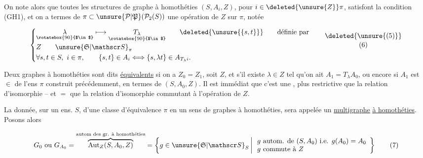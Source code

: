 On note alors que toutes les structures de graphe à homothéties $(S,A_i,Z)$, pour $i\in\deleted{\unsure{Z}}\pi$, satisfont la condition (GH1), et on a  termes de  $\pi\subset\unsure{\mathcal P|\mathfrak P}(\mathcal P_2(S))$ une opération de $Z$ sur $\pi$, notée

\[
\left\{\begin{aligned}
 &\underset{\rotatebox{90}{$\in$}}{\lambda}\longmapsto\underset{\rotatebox{90}{$\in$}}{T_\lambda}
       \qquad \deleted{\unsure{\{s,t\}}}\qquad\text{définie par}\\[-2pt]
 &Z\qquad \unsure{\mathfrak S|\mathscr S}_\pi\\
 &\forall s,t\in S,\ i\in\pi,\qquad\{s,t\}\in A_i\Longleftrightarrow\{s,\lambda t\}\in A_{T_\lambda i}.
\end{aligned}\right.\tag*{\shortstack{\deleted{\unsure{(5)}}\\(6)}}
\]


Deux  graphes à homothéties  sont dits \uline{équivalents}    si on a $Z_0=Z_1$, soit $Z$, et s'il existe $\lambda\in Z$ tel qu'on ait $A_1=T_\lambda A_0$,  ou encore si $A_1$ est $\in$ de l'ens $\pi$ construit précédemment, en termes de $(S,A_0,Z)$. Il est immédiat que c'est  une  , plus restrictive que la relation d'isomorphie -- et $=$ que la relation d'isomorphie commutant à l'opération de $Z$.

La donnée,  sur un ens. $S$, d'une classe d'équivalence $\pi$ en un sens de graphes à homothéties, sera appelée un \uline{multigraphe} \uline{à homothéties}. Posons alors



\[
G_0\ \text{ou}\ G_{A_0}=\overbrace{\operatorname{Aut}_Z(S,A_0,Z)}^{\text{autom des gr. à homothéties}}=\left\{g\in\unsure{\mathfrak S|\mathscr S}_S\,\middle|\,
\begin{array}{l}g\text{ autom. de }(S,A_0)\ \text{i.e. }g(A_0)=A_0\\g\text{ commute à }Z\end{array}\right\}\tag*{(7)}
\]

